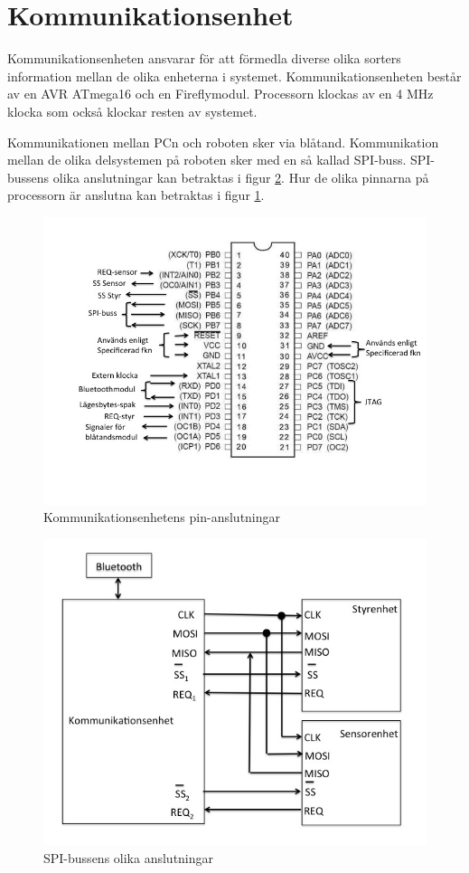 \section{Kommunikationsenhet}
Kommunikationsenheten ansvarar för att förmedla diverse olika sorters information mellan de olika enheterna i systemet. Kommunikationsenheten består av en AVR ATmega16 och en Fireflymodul. Processorn klockas av en 4 MHz klocka som också klockar resten av systemet. 

Kommunikationen mellan PCn och roboten sker via blåtand. Kommunikation mellan de olika delsystemen på roboten sker med en så kallad SPI-buss. SPI-bussens olika anslutningar kan betraktas i figur \ref{fig:spibuss}. Hur de olika pinnarna på processorn är anslutna kan betraktas i figur \ref{fig:PINkomm}.

\begin{figure}[H]
  \centering
 \includegraphics[angle=0,scale=0.5]{bilder/PIN_komm.jpg}
  \caption{Kommunikationsenhetens pin-anslutningar}
  \label{fig:PINkomm}
\end{figure}


\begin{figure}[H]
  \centering
 \includegraphics[angle=0,scale=0.5]{bilder/SPI-buss.png}
  \caption{SPI-bussens olika anslutningar}
  \label{fig:spibuss}
\end{figure}


